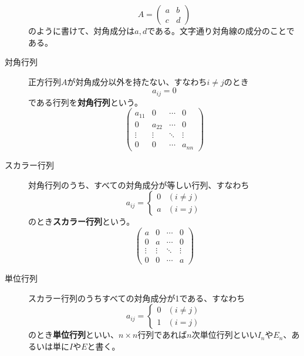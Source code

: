 \documentclass[10pt]{jsreport}
\theoremstyle{definition}%
\numberwithin{equation}{section}%
\begin{document}
\begin{framed}
\begin{description}
\begin{equation}
  A=\left( 
\begin{matrix}
  a & b \\
  c & d
\end{matrix}
  \right)  
  \end{equation}
  のように書けて、対角成分は$a,d$である。文字通り対角線の成分のことである。
  \item[対角行列] 正方行列$A$が対角成分以外を持たない、すなわち$i\neq j$のとき
  \begin{equation}
  a_{ij}=0  
  \end{equation}
  である行列を{\bf 対角行列}という。
  \begin{equation}
    \left( \begin{matrix}
      a_{11} & 0 & \cdots & 0 \\
      0 & a_{22} & \cdots & 0 \\
      \vdots  & \vdots  & \ddots & \vdots \\
      0& 0 & \cdots & a_{nn}
    \end{matrix} \right)
  \end{equation}
  \item[スカラー行列] 対角行列のうち、すべての対角成分が等しい行列、すなわち
\begin{equation}
  a_{ij} =\begin{cases}
    0 & (i\neq j)\\
    a& (i=j)
  \end{cases}
\end{equation}
  のとき{\bf スカラー行列}という。
  \begin{equation}
    \left( \begin{matrix}
      a & 0 & \cdots & 0 \\
      0 & a & \cdots & 0 \\
      \vdots  & \vdots  & \ddots & \vdots \\
      0& 0 & \cdots & a
    \end{matrix} \right)
  \end{equation}
  \item[単位行列] スカラー行列のうちすべての対角成分が1である、すなわち
  \begin{equation}
    a_{ij}=\begin{cases}
      0 & (i\neq j)\\
      1& (i=j)
    \end{cases}
  \end{equation}
  のとき{\bf 単位行列}といい、$n\times n$行列であれば$n$次単位行列といい$I_{n}$や$E_{n}$、あるいは単に$I$や$E$と書く。

\end{description}
\end{framed}
\end{document}
